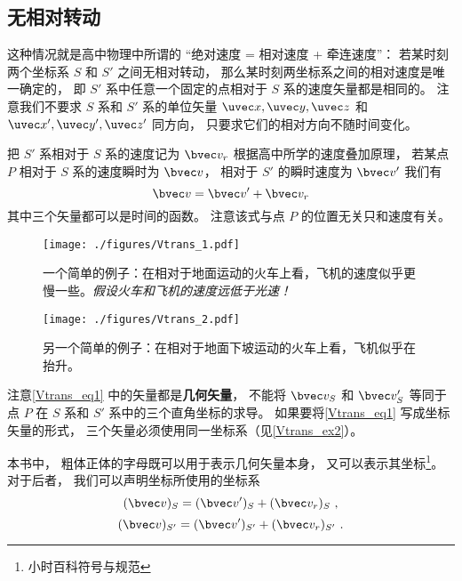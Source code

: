 


\subsection{无相对转动}\label{Vtrans_sub1}
这种情况就是高中物理中所谓的 “绝对速度 = 相对速度 + 牵连速度”： 若某时刻两个坐标系 $S$ 和 $S'$ 之间无相对转动， 那么某时刻两坐标系之间的相对速度是唯一确定的， 即 $S'$ 系中任意一个固定的点相对于 $S$ 系的速度矢量都是相同的。 注意我们不要求 $S$ 系和 $S'$ 系的单位矢量 $\uvec x, \uvec y, \uvec z$ 和 $\uvec x', \uvec y', \uvec z'$ 同方向， 只要求它们的相对方向不随时间变化。

把 $S'$ 系相对于 $S$ 系的速度记为 $\bvec v_r$ 根据高中所学的速度叠加原理， 若某点 $P$ 相对于 $S$ 系的速度瞬时为 $\bvec v$， 相对于 $S'$ 的瞬时速度为 $\bvec v'$ 我们有
\begin{equation}\label{Vtrans_eq1}
\bvec v = \bvec v' + \bvec v_r
\end{equation}
其中三个矢量都可以是时间的函数。 注意该式与点 $P$ 的位置无关只和速度有关。

\begin{figure}[ht]
\centering
\texttt{[image: ./figures/Vtrans\_1.pdf]}
\caption{一个简单的例子：在相对于地面运动的火车上看，飞机的速度似乎更慢一些。\textsl{假设火车和飞机的速度远低于光速！}} \label{Vtrans_fig1}
\end{figure}

\begin{figure}[ht]
\centering
\texttt{[image: ./figures/Vtrans\_2.pdf]}
\caption{另一个简单的例子：在相对于地面下坡运动的火车上看，飞机似乎在抬升。} \label{Vtrans_fig2}
\end{figure}

注意\autoref{Vtrans_eq1} 中的矢量都是\textbf{几何矢量}， 不能将 $\bvec v_S$ 和 $\bvec v_S'$ 等同于点 $P$ 在 $S$ 系和 $S'$ 系中的三个直角坐标的求导。 如果要将\autoref{Vtrans_eq1} 写成坐标矢量的形式， 三个矢量必须使用同一坐标系（见\autoref{Vtrans_ex2}）。

本书中， 粗体正体的字母既可以用于表示几何矢量本身， 又可以表示其坐标\footnote{小时百科符号与规范}。 对于后者， 我们可以声明坐标所使用的坐标系
\begin{equation}\label{Vtrans_eq5}
(\bvec v)_{S} = (\bvec v')_{S} + (\bvec v_r)_{S}~,
\end{equation}
\begin{equation}\label{Vtrans_eq6}
(\bvec v)_{S'} = (\bvec v')_{S'} + (\bvec v_r)_{S'}~.
\end{equation}

